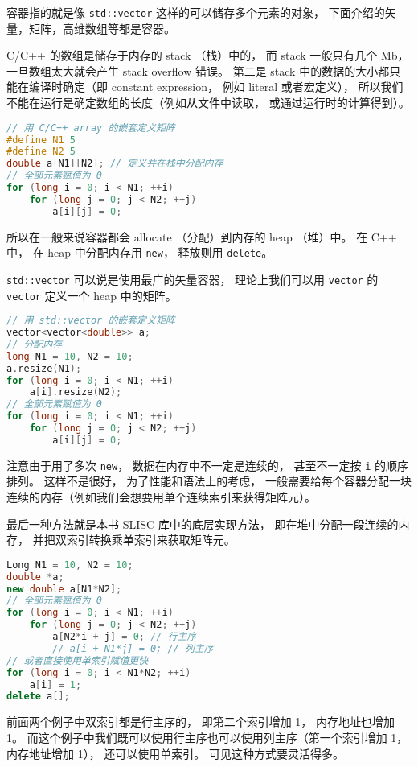 


容器指的就是像 \verb|std::vector| 这样的可以储存多个元素的对象， 下面介绍的矢量，矩阵，高维数组等都是容器。

C/C++ 的数组是储存于内存的 stack （栈）中的， 而 stack 一般只有几个 Mb， 一旦数组太大就会产生 stack overflow 错误。 第二是 stack 中的数据的大小都只能在编译时确定（即 constant expression， 例如 literal 或者宏定义）， 所以我们不能在运行是确定数组的长度（例如从文件中读取， 或通过运行时的计算得到）。
\begin{lstlisting}[language=cpp]
// 用 C/C++ array 的嵌套定义矩阵
#define N1 5
#define N2 5
double a[N1][N2]; // 定义并在栈中分配内存
// 全部元素赋值为 0
for (long i = 0; i < N1; ++i)
    for (long j = 0; j < N2; ++j)
        a[i][j] = 0;
\end{lstlisting}

所以在一般来说容器都会 allocate （分配）到内存的 heap （堆）中。 在 C++ 中， 在 heap 中分配内存用 \verb|new|， 释放则用 \verb|delete|。

\verb|std::vector| 可以说是使用最广的矢量容器， 理论上我们可以用 \verb|vector| 的 \verb|vector| 定义一个 heap 中的矩阵。
\begin{lstlisting}[language=cpp]
// 用 std::vector 的嵌套定义矩阵
vector<vector<double>> a;
// 分配内存
long N1 = 10, N2 = 10;
a.resize(N1);
for (long i = 0; i < N1; ++i)
    a[i].resize(N2);
// 全部元素赋值为 0
for (long i = 0; i < N1; ++i)
    for (long j = 0; j < N2; ++j)
        a[i][j] = 0;
\end{lstlisting}
注意由于用了多次 \verb|new|， 数据在内存中不一定是连续的， 甚至不一定按 \verb|i| 的顺序排列。 这样不是很好， 为了性能和语法上的考虑， 一般需要给每个容器分配一块连续的内存（例如我们会想要用单个连续索引来获得矩阵元）。

最后一种方法就是本书 SLISC 库中的底层实现方法， 即在堆中分配一段连续的内存， 并把双索引转换乘单索引来获取矩阵元。
\begin{lstlisting}[language=cpp]
Long N1 = 10, N2 = 10;
double *a;
new double a[N1*N2];
// 全部元素赋值为 0
for (long i = 0; i < N1; ++i)
    for (long j = 0; j < N2; ++j)
        a[N2*i + j] = 0; // 行主序
        // a[i + N1*j] = 0; // 列主序
// 或者直接使用单索引赋值更快
for (long i = 0; i < N1*N2; ++i)
    a[i] = 1;
delete a[];
\end{lstlisting}
前面两个例子中双索引都是行主序的， 即第二个索引增加 1， 内存地址也增加 1。 而这个例子中我们既可以使用行主序也可以使用列主序（第一个索引增加 1， 内存地址增加 1）， 还可以使用单索引。 可见这种方式要灵活得多。

